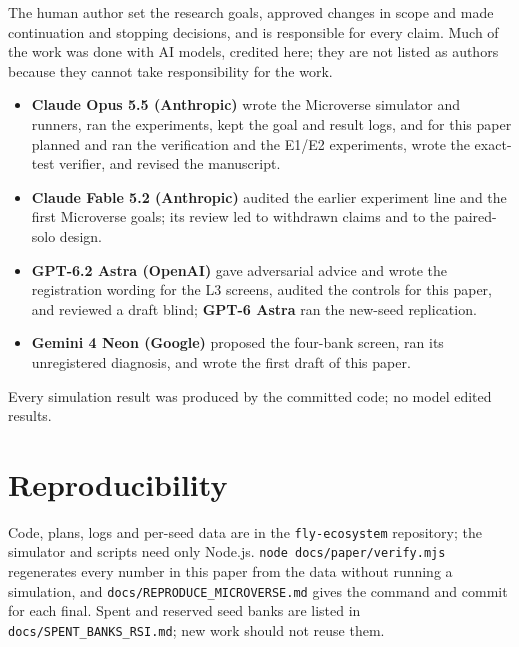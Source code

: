 \documentclass[11pt]{article}
\begin{document}
The human author set the research goals, approved changes in scope and made continuation and stopping decisions, and is responsible for every claim. Much of the work was done with AI models, credited here; they are not listed as authors because they cannot take responsibility for the work.
\begin{itemize}
  \item \textbf{Claude Opus 5.5 (Anthropic)} wrote the Microverse simulator and runners, ran the experiments, kept the goal and result logs, and for this paper planned and ran the verification and the E1/E2 experiments, wrote the exact-test verifier, and revised the manuscript.
  \item \textbf{Claude Fable 5.2 (Anthropic)} audited the earlier experiment line and the first Microverse goals; its review led to withdrawn claims and to the paired-solo design.
  \item \textbf{GPT-6.2 Astra (OpenAI)} gave adversarial advice and wrote the registration wording for the L3 screens, audited the controls for this paper, and reviewed a draft blind; \textbf{GPT-6 Astra} ran the new-seed replication.
  \item \textbf{Gemini 4 Neon (Google)} proposed the four-bank screen, ran its unregistered diagnosis, and wrote the first draft of this paper.
\end{itemize}
Every simulation result was produced by the committed code; no model edited results.

\section{Reproducibility}
\label{sec:repro}

Code, plans, logs and per-seed data are in the \texttt{fly-ecosystem} repository; the simulator and scripts need only Node.js. \texttt{node docs/paper/verify.mjs} regenerates every number in this paper from the data without running a simulation, and \texttt{docs/REPRODUCE\_MICROVERSE.md} gives the command and commit for each final. Spent and reserved seed banks are listed in \texttt{docs/SPENT\_BANKS\_RSI.md}; new work should not reuse them.




\appendix



\end{document}
